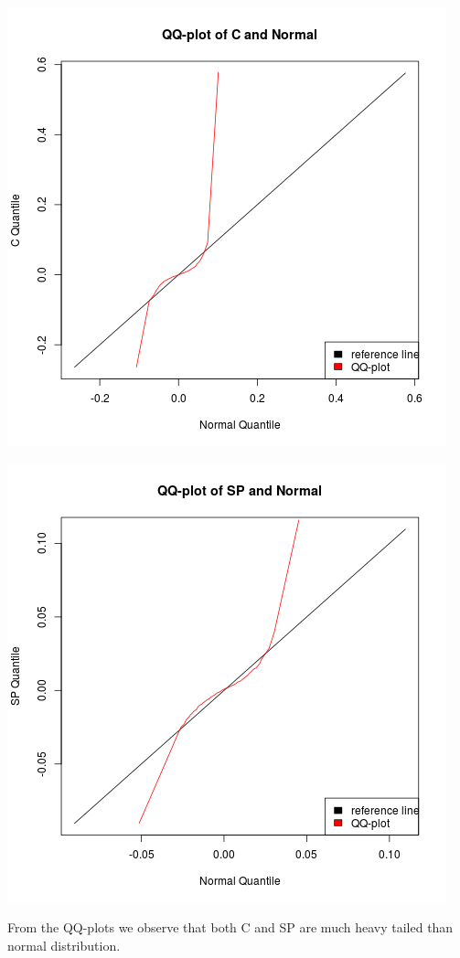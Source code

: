 \documentclass{article}
\begin{document}
\includegraphics{"plotb1"}
\pagebreak

\includegraphics{"plotb2"}
\pagebreak

From the QQ-plots we observe that both C and SP are much heavy tailed than normal distribution.
\end{document}
